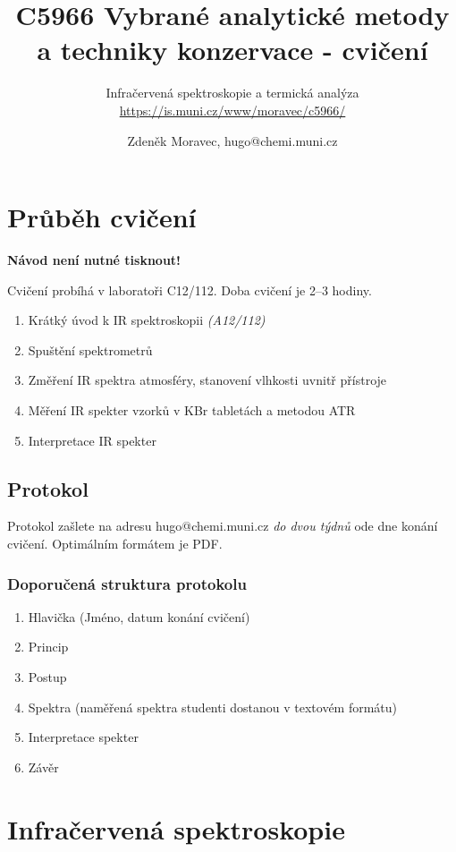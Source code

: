 \documentclass[12pt]{article}
\title{C5966 Vybrané analytické metody a techniky konzervace - cvičení}
\subtitle{Infračervená spektroskopie a termická analýza\\ \url{https://is.muni.cz/www/moravec/c5966/}}
\author %
{Zdeněk Moravec, hugo@chemi.muni.cz}
\date{}
\begin{document}
\maketitle

\pagebreak

\section{Průběh cvičení}

	\textbf{Návod není nutné tisknout!}

	Cvičení probíhá v laboratoři C12/112. Doba cvičení je 2--3 hodiny.

	\begin{enumerate}
	\item Krátký úvod k IR spektroskopii \textit{(A12/112)}
	\item Spuštění spektrometrů
	\item Změření IR spektra atmosféry, stanovení vlhkosti uvnitř přístroje
	\item Měření IR spekter vzorků v KBr tabletách a metodou ATR
	\item Interpretace IR spekter
	\end{enumerate}

\subsection{Protokol}

Protokol zašlete na adresu hugo@chemi.muni.cz \textit{do dvou týdnů} ode dne konání cvičení. Optimálním formátem je PDF.

\subsubsection{Doporučená struktura protokolu}

	\begin{enumerate}
	\item Hlavička (Jméno, datum konání cvičení)
	\item Princip
	\item Postup
	\item Spektra (naměřená spektra studenti dostanou v textovém formátu)
	\item Interpretace spekter
	\item Závěr
	\end{enumerate}

\newpage
\section{Infračervená spektroskopie}
\end{document}
